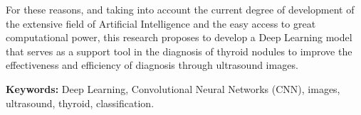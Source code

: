 For these reasons, and taking into account the current degree of development of the extensive field of Artificial Intelligence and the easy access to great computational power, this research proposes to develop a Deep Learning model that serves as a support tool in the diagnosis of thyroid nodules to improve the effectiveness and efficiency of diagnosis through ultrasound images.
\newline

\textbf{Keywords: } Deep Learning, Convolutional Neural Networks (CNN), images, ultrasound, thyroid, classification.